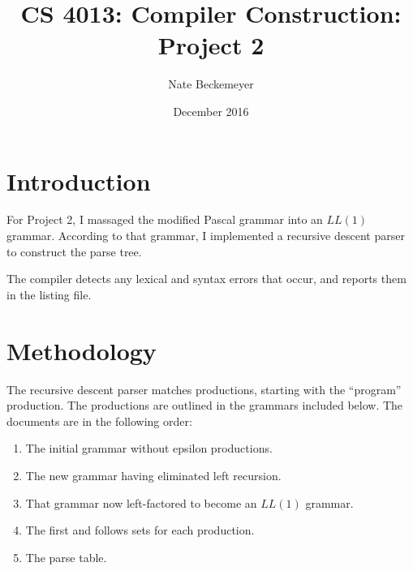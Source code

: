 \documentclass[titlepage]{article}
\author{Nate Beckemeyer}
\title{\textbf{CS 4013: Compiler Construction: Project 2}}
\date{December 2016}
\begin{document}
    \maketitle
    \section*{Introduction}
    For Project 2, I massaged the modified Pascal grammar into an $LL(1)$
    grammar. According to that grammar, I implemented a recursive descent parser
    to construct the parse tree.

    The compiler detects any lexical and syntax errors that occur, and reports
    them in the listing file.

    \section{Methodology}
    The recursive descent parser matches productions, starting with the
    ``program'' production. The productions are outlined in the grammars
    included below. The documents are in the following order:
    \begin{enumerate}
        \item The initial grammar without epsilon productions.
        \item The new grammar having eliminated left recursion.
        \item That grammar now left-factored to become an $LL(1)$ grammar.
        \item The first and follows sets for each production.
        \item The parse table.
    \end{enumerate}
\end{document}
